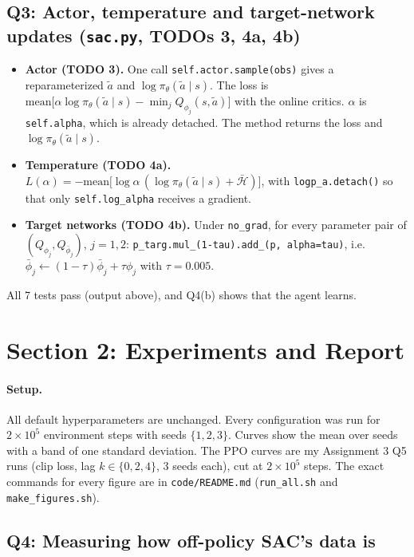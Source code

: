 \documentclass[11pt]{article}
\newcommand{\code}[1]{\texttt{#1}}
\begin{document}
\subsection*{Q3: Actor, temperature and target-network updates (\code{sac.py}, TODOs 3, 4a, 4b)}
\begin{itemize}
  \item \textbf{Actor (TODO 3).} One call \code{self.actor.sample(obs)} gives a reparameterized
        $\tilde a$ and $\log\pi_\theta(\tilde a\mid s)$. The loss is
        $\mathrm{mean}\big[\alpha\log\pi_\theta(\tilde a\mid s)-\min_j Q_{\phi_j}(s,\tilde a)\big]$ with the
        online critics. $\alpha$ is \code{self.alpha}, which is already detached. The method returns the loss and
        $\log\pi_\theta(\tilde a\mid s)$.
  \item \textbf{Temperature (TODO 4a).}
        $L(\alpha)=-\mathrm{mean}\big[\log\alpha\,(\log\pi_\theta(\tilde a\mid s)+\bar{\mathcal H})\big]$,
        with \code{logp\_a.detach()} so that only \code{self.log\_alpha} receives a gradient.
  \item \textbf{Target networks (TODO 4b).} Under \code{no\_grad}, for every parameter pair of
        $(Q_{\phi_j},Q_{\bar\phi_j})$, $j=1,2$: \code{p\_targ.mul\_(1-tau).add\_(p, alpha=tau)}, i.e.\
        $\bar\phi_j\leftarrow(1-\tau)\bar\phi_j+\tau\phi_j$ with $\tau=0.005$.
\end{itemize}
All 7 tests pass (output above), and Q4(b) shows that the agent learns.

\section*{Section 2: Experiments and Report}

\paragraph{Setup.} All default hyperparameters are unchanged. Every configuration was run for
$2\times10^5$ environment steps with seeds $\{1,2,3\}$. Curves show the mean over seeds with a band of
one standard deviation. The PPO curves are my Assignment 3 Q5 runs (clip loss, lag
$k\in\{0,2,4\}$, 3 seeds each), cut at $2\times10^5$ steps. The exact commands for every figure are in
\code{code/README.md} (\code{run\_all.sh} and \code{make\_figures.sh}).

\subsection*{Q4: Measuring how off-policy SAC's data is}
\end{document}
